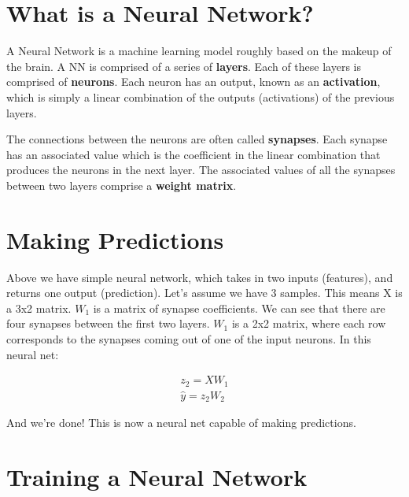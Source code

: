 \documentclass[]{article}
\title{}
\author{}
\begin{document}
\maketitle

\begin{abstract}

\end{abstract}

\section{What is a Neural Network?}

A Neural Network is a machine learning model roughly based on the makeup of the brain. A NN is comprised of a series of \textbf{layers}. Each of these layers is comprised of \textbf{neurons}. Each neuron has an output, known as an \textbf{activation}, which is simply a linear combination of the outputs (activations) of the previous layers.

The connections between the neurons are often called \textbf{synapses}. Each synapse has an associated value which is the coefficient in the linear combination that produces the neurons in the next layer. The associated values of all the synapses between two layers comprise a \textbf{weight matrix}.

\section{Making Predictions}

Above we have simple neural network, which takes in two inputs (features), and returns one output (prediction). Let's assume we have 3 samples. This means X is a 3x2 matrix. $W_1$ is a matrix of synapse coefficients. We can see that there are four synapses between the first two layers. $W_1$ is a 2x2 matrix, where each row corresponds to the synapses coming out of one of the input neurons. In this neural net:

\begin{gather}
	z_2 = X W_1\\
	\hat{y} = z_2 W_2
\end{gather}

And we're done! This is now a neural net capable of making predictions.

\section{Training a Neural Network}
\end{document}
